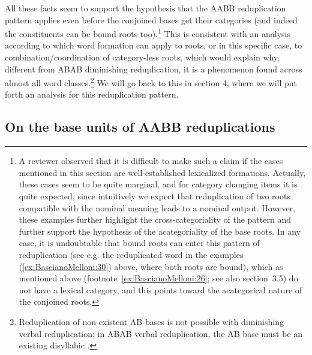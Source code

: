 \documentclass[output=paper]{langsci/langscibook}
\begin{document}
\largerpage
All these facts seem to support the hypothesis that the AABB
reduplication pattern applies even before the conjoined bases get their
categories (and indeed the constituents can be bound roots
too).\footnote{A reviewer observed that it is difficult to make such a
  claim if the cases mentioned in this section are well-established
  lexicalized formations. Actually, these cases seem to be quite
  marginal, and for category changing items it is quite expected, since
  intuitively we expect that reduplication of two roots compatible with
  the nominal meaning leads to a nominal output. However, these examples
  further highlight the cross-categoriality of the pattern and further
  support the hypothesis of the acategoriality of the base roots. In any
  case, it is undoubtable that bound roots can enter this pattern of
  reduplication (see e.g. the reduplicated word in the examples (\ref{ex:BascianoMelloni:30})
  above, where both roots are bound), which as mentioned above (footnote~\ref{ex:BascianoMelloni:26};
  see also section~3.5) do not have a lexical category, and this points toward
  the acategorical nature of the conjoined roots.} This is consistent with an
analysis according to which word formation can apply to roots, or in
this specific case, to combination/coordination of category-less roots,
which would explain why, different from ABAB diminishing reduplication,
it is a phenomenon found across almost all word classes.\footnote{Reduplication
  of non-existent AB bases is not possible with diminishing verbal
  reduplication; in ABAB verbal reduplication, the AB base must be an
  existing disyllabic .} We will go back to this in section 4,
where we will put forth an analysis for this reduplication pattern.

\subsection{On the base units of AABB reduplications}
\end{document}
